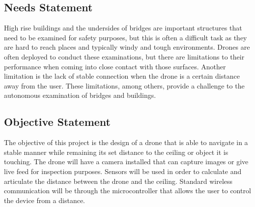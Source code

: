 \documentclass[12pt]{article}
\begin{document}
        \subsection{Needs Statement}
            High rise buildings and the undersides of bridges are important structures that need to be examined for safety purposes, but this is often a difficult task as they are hard to reach places and typically windy and tough environments.
            Drones are often deployed to conduct these examinations, but there are limitations to their performance when coming into close contact with those surfaces.
            Another limitation is the lack of stable connection when the drone is a certain distance away from the user.
            These limitations, among others, provide a challenge to the autonomous examination of bridges and buildings.

        \subsection{Objective Statement}
            The objective of this project is the design of a drone that is able to navigate in a stable manner while remaining its set distance to the ceiling or object it is touching.
            The drone will have a camera installed that can capture images or give live feed for inspection purposes.
            Sensors will be used in order to calculate and articulate the distance between the drone and the ceiling.
            Standard wireless communication will be through the microcontroller that allows the user to control the device from a distance.

        \newpage
\end{document}
